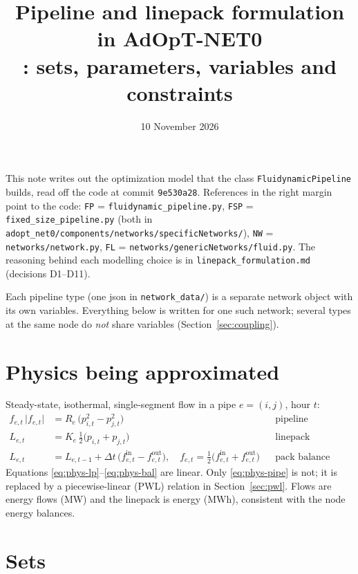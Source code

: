 \documentclass[11pt,a4paper]{article}
\title{Pipeline and linepack formulation in AdOpT-NET0\\[2pt]
\large \code{FluidynamicPipeline}: sets, parameters, variables and constraints}
\author{}
\date{10 November 2026}
\newcommand{\code}[1]{\texttt{#1}}
\newcommand{\fin}{f^{\mathrm{in}}}
\newcommand{\fout}{f^{\mathrm{out}}}
\begin{document}
\maketitle

\noindent This note writes out the optimization model that the class
\code{FluidynamicPipeline} builds, read off the code at commit \code{9e530a28}.
References in the right margin point to the code:
\code{FP} = \code{fluidynamic\_pipeline.py},
\code{FSP} = \code{fixed\_size\_pipeline.py} (both in
\code{adopt\_net0/components/networks/specificNetworks/}),
\code{NW} = \code{networks/network.py},
\code{FL} = \code{networks/genericNetworks/fluid.py}.
The reasoning behind each modelling choice is in \code{linepack\_formulation.md}
(decisions D1--D11).

Each pipeline type (one json in \code{network\_data/}) is a separate network
object with its own variables. Everything below is written for one such
network; several types at the same node do \emph{not} share variables
(Section~\ref{sec:coupling}).

\tableofcontents

\section{Physics being approximated}

Steady-state, isothermal, single-segment flow in a pipe $e=(i,j)$, hour $t$:
\begin{align}
  f_{e,t}\,\lvert f_{e,t}\rvert &= R_e\,\bigl(p_{i,t}^2 - p_{j,t}^2\bigr)
  && \text{pipeline (Weymouth-type) equation} \label{eq:phys-pipe}\\
  L_{e,t} &= K_e\,\tfrac12\bigl(p_{i,t}+p_{j,t}\bigr)
  && \text{linepack} \label{eq:phys-lp}\\
  L_{e,t} &= L_{e,t-1} + \Delta t\,\bigl(\fin_{e,t}-\fout_{e,t}\bigr),
  \quad f_{e,t} = \tfrac12\bigl(\fin_{e,t}+\fout_{e,t}\bigr)
  && \text{pack balance} \label{eq:phys-bal}
\end{align}
Equations \eqref{eq:phys-lp}--\eqref{eq:phys-bal} are linear.
Only \eqref{eq:phys-pipe} is not; it is replaced by a piecewise-linear (PWL)
relation in Section~\ref{sec:pwl}. Flows are energy flows (MW) and the
linepack is energy (MWh), consistent with the node energy balances.

\section{Sets}
\end{document}
